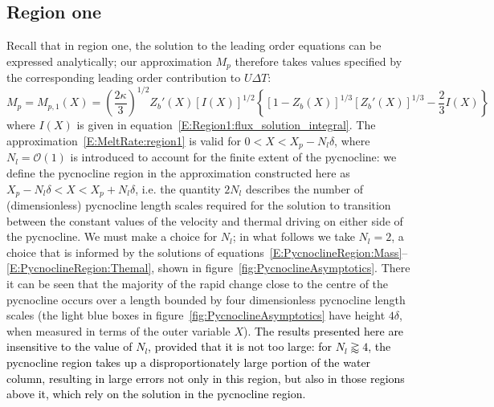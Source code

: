 \documentclass[openacc]{rsproca_new}%
\newcommand{\order}[1]{\mathcal{O}(#1)}
\newcommand{\blue}[1]{{\color{blue} #1}}
\renewcommand{\blue}[1]{{\textcolor{black}{#1}}} %
\newcommand{\lt}{\delta} %
\begin{document}
\subsection{Region one}
Recall that in region one, the solution to the leading order equations can be expressed analytically; our approximation $M_p$ therefore takes values specified by the corresponding leading order contribution to $U\Delta T$:
\begin{equation}\label{E:MeltRate:region1}
M_{p} = M_{p,1}(X) = \left(\frac{2\kappa}{3}\right)^{1/2}Z_b'(X)\left[I(X)\right]^{1/2}\left\{\left[1 - Z_b(X)\right]^{1/3}\left[Z_b'(X)\right]^{1/3} - \frac{2}{3}I(X) \right\} %
\end{equation}
where $I(X)$ is given in equation~\eqref{E:Region1:flux_solution_integral}. The approximation~\eqref{E:MeltRate:region1} is valid for $0 < X < X_p - N_l \lt $, where $N_l = \order{1}$ is introduced to account for the finite extent of the pycnocline: we define the pycnocline region in  the approximation constructed here as $X_p - N_l \lt < X < X_p + N_l \lt$, i.e. the quantity $2 N_l$ describes the number of (dimensionless) pycnocline length scales required for the solution to transition between the constant values of the velocity and thermal driving on either side of the pycnocline.  We must make a choice for $N_l$; in what follows we take $N_l = 2$, a choice that is informed by the solutions of equations~\eqref{E:PycnoclineRegion:Mass}--\eqref{E:PycnoclineRegion:Themal}, shown in figure~\ref{fig:PycnoclineAsymptotics}. There it can be seen that the majority of the rapid change close to the centre of the pycnocline occurs over a length bounded by four dimensionless pycnocline length scales (the light blue boxes in figure~\ref{fig:PycnoclineAsymptotics} have height $4\lt$, when measured in terms of the outer variable $X$). \blue{The results presented here are insensitive to the value of $N_l$, provided that it is not too large: for $N_l \gtrapprox 4$, the pycnocline region takes up a disproportionately large portion of the water column, resulting in large errors not only in this region, but also in those regions above it, which rely on the solution in the pycnocline region.}
\end{document}
